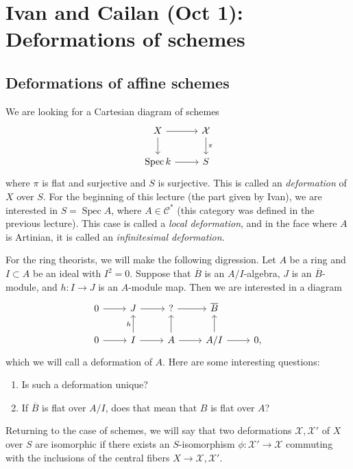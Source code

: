 \documentclass[leqno, openany]{memoir}
\theoremstyle{definition}
\theoremstyle{remark}
\theoremstyle{plain}
\theoremstyle{definition}
\theoremstyle{remark}
\newcommand{\mc}[1]{\mathcal{#1}}
\newcommand{\ol}[1]{\overline{#1}}
\DeclareMathOperator{\Spec}{Spec}
\begin{document}
\chapter{Ivan and Cailan (Oct 1): Deformations of schemes}%
\label{cha:ivan_and_cailan_oct_1_deformations_of_schemes}

\section{Deformations of affine schemes}%
\label{sec:deformations}

We are looking for a Cartesian diagram of schemes
\begin{equation*}
\begin{tikzcd}
    X \ar{r} \ar{d} & \mc{X} \ar{d}{\pi} \\
    \Spec k \ar{r} & S
\end{tikzcd}
\end{equation*}
where $\pi$ is flat and surjective and $S$ is surjective. This is called an \textit{deformation} of $X$ over $S$. For the beginning of this lecture (the part given by Ivan), we are interested in $S = \Spec A$, where $A \in \mc{C}^*$ (this category was defined in the previous lecture). This case is called a \textit{local deformation}, and in the face where $A$ is Artinian, it is called an \textit{infinitesimal deformation}.

For the ring theorists, we will make the following digression. Let $A$ be a ring and $I \subset A$ be an ideal with $I^2 = 0$. Suppose that $\ol{B}$ is an $A/I$-algebra, $J$ is an $\ol{B}$-module, and $h \colon I \to J$ is an $A$-module map. Then we are interested in a diagram
\begin{equation*}
\begin{tikzcd}
    0 \ar{r} & J \ar{r} & ? \ar{r} & \ol{B} \\
    0 \ar{r} & I \ar{u}{h} \ar{r} & A \ar{u} \ar{r} & A/I \ar{u} \ar{r} & 0,
\end{tikzcd}
\end{equation*}
which we will call a deformation of $A$. Here are some interesting questions:
\begin{enumerate}
    \item Is such a deformation unique?
    \item If $\ol{B}$ is flat over $A/I$, does that mean that $B$ is flat over $A$?
\end{enumerate}

Returning to the case of schemes, we will say that two deformations $\mc{X}, \mc{X}'$ of $X$ over $S$ are isomorphic if there exists an $S$-isomorphism $\phi \colon \mc{X}' \to \mc{X}$ commuting with the inclusions of the central fibers $X \to \mc{X}, \mc{X}'$.
\end{document}
